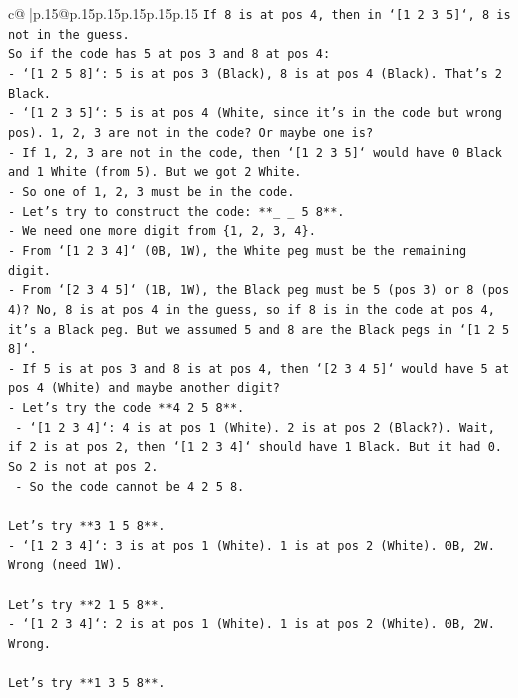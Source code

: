 \documentclass{article}
\begin{document}
{\begin{supertabular}{c@{$\;$}|p{.15\linewidth}@{}p{.15\linewidth}p{.15\linewidth}p{.15\linewidth}p{.15\linewidth}p{.15\linewidth}}
{{{\texttt{If 8 is at pos 4, then in `{[}1 2 3 5{]}`, 8 is not in the guess.} \\
\texttt{So if the code has 5 at pos 3 and 8 at pos 4:} \\
\texttt{{-} `{[}1 2 5 8{]}`: 5 is at pos 3 (Black), 8 is at pos 4 (Black). That's 2 Black.} \\
\texttt{{-} `{[}1 2 3 5{]}`: 5 is at pos 4 (White, since it's in the code but wrong pos). 1, 2, 3 are not in the code? Or maybe one is?} \\
\texttt{{-} If 1, 2, 3 are not in the code, then `{[}1 2 3 5{]}` would have 0 Black and 1 White (from 5). But we got 2 White.} \\
\texttt{{-} So one of 1, 2, 3 must be in the code.} \\
\texttt{{-} Let's try to construct the code: **\_ \_ 5 8**.} \\
\texttt{{-} We need one more digit from \{1, 2, 3, 4\}.} \\
\texttt{{-} From `{[}1 2 3 4{]}` (0B, 1W), the White peg must be the remaining digit.} \\
\texttt{{-} From `{[}2 3 4 5{]}` (1B, 1W), the Black peg must be 5 (pos 3) or 8 (pos 4)? No, 8 is at pos 4 in the guess, so if 8 is in the code at pos 4, it's a Black peg. But we assumed 5 and 8 are the Black pegs in `{[}1 2 5 8{]}`.} \\
\texttt{{-} If 5 is at pos 3 and 8 is at pos 4, then `{[}2 3 4 5{]}` would have 5 at pos 4 (White) and maybe another digit?} \\
\texttt{{-} Let's try the code **4 2 5 8**.} \\
\texttt{    {-} `{[}1 2 3 4{]}`: 4 is at pos 1 (White). 2 is at pos 2 (Black?). Wait, if 2 is at pos 2, then `{[}1 2 3 4{]}` should have 1 Black. But it had 0. So 2 is not at pos 2.} \\
\texttt{    {-} So the code cannot be 4 2 5 8.} \\
\\ 
\texttt{Let's try **3 1 5 8**.} \\
\texttt{{-} `{[}1 2 3 4{]}`: 3 is at pos 1 (White). 1 is at pos 2 (White). 0B, 2W. Wrong (need 1W).} \\
\\ 
\texttt{Let's try **2 1 5 8**.} \\
\texttt{{-} `{[}1 2 3 4{]}`: 2 is at pos 1 (White). 1 is at pos 2 (White). 0B, 2W. Wrong.} \\
\\ 
\texttt{Let's try **1 3 5 8**.} \\
}}}
\end{supertabular}}
\end{document}
